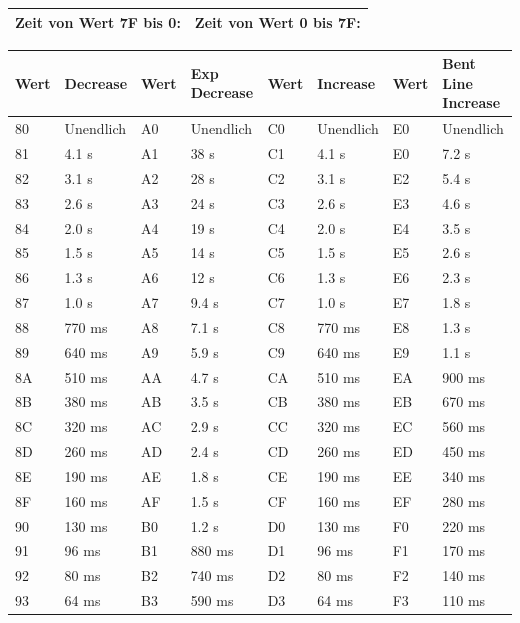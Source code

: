 \begin{table}[htbp]
\begin{tabularx}{\textwidth}{|X|X|}
	\hline
	Zeit von Wert 7F bis 0: & Zeit von Wert 0 bis 7F: \\
	\hline
\end{tabularx}

\begin{tabularx}{\textwidth}{|l|X|l|X|l|X|l|X|}
	\hline
	Wert & Decrease & Wert & Exp Decrease & Wert & Increase & Wert & Bent Line Increase \\
	\hline
	80 & Unendlich & A0 & Unendlich & C0 & Unendlich & E0 & Unendlich \\
	\hline
	81 & 4.1 s & A1 & 38 s & C1 & 4.1 s & E0 & 7.2 s \\
	\hline
	82 & 3.1 s & A2 & 28 s & C2 & 3.1 s & E2 & 5.4 s \\
	\hline
	83 & 2.6 s & A3 & 24 s & C3 & 2.6 s & E3 & 4.6 s \\
	\hline
	84 & 2.0 s & A4 & 19 s & C4 & 2.0 s & E4 & 3.5 s \\
	\hline
	85 & 1.5 s & A5 & 14 s & C5 & 1.5 s & E5 & 2.6 s \\
	\hline
	86 & 1.3 s & A6 & 12 s & C6 & 1.3 s & E6 & 2.3 s \\
	\hline
	87 & 1.0 s & A7 & 9.4 s & C7 & 1.0 s & E7 & 1.8 s \\
	\hline
	88 & 770 ms & A8 & 7.1 s & C8 & 770 ms & E8 & 1.3 s \\
	\hline
	89 & 640 ms & A9 & 5.9 s & C9 & 640 ms & E9 & 1.1 s \\
	\hline
	8A & 510 ms & AA & 4.7 s & CA & 510 ms & EA & 900 ms \\
	\hline
	8B & 380 ms & AB & 3.5 s & CB & 380 ms & EB & 670 ms \\
	\hline
	8C & 320 ms & AC & 2.9 s & CC & 320 ms & EC & 560 ms \\
	\hline
	8D & 260 ms & AD & 2.4 s & CD & 260 ms & ED & 450 ms \\
	\hline
	8E & 190 ms & AE & 1.8 s & CE & 190 ms & EE & 340 ms \\
	\hline
	8F & 160 ms & AF & 1.5 s & CF & 160 ms & EF & 280 ms \\
	\hline
	90 & 130 ms & B0 & 1.2 s & D0 & 130 ms & F0 & 220 ms \\
	\hline
	91 & 96 ms & B1 & 880 ms & D1 & 96 ms & F1 & 170 ms \\
	\hline
	92 & 80 ms & B2 & 740 ms & D2 & 80 ms & F2 & 140 ms \\
	\hline
	93 & 64 ms & B3 & 590 ms & D3 & 64 ms & F3 & 110 ms \\

\end{tabularx}
\end{table}
